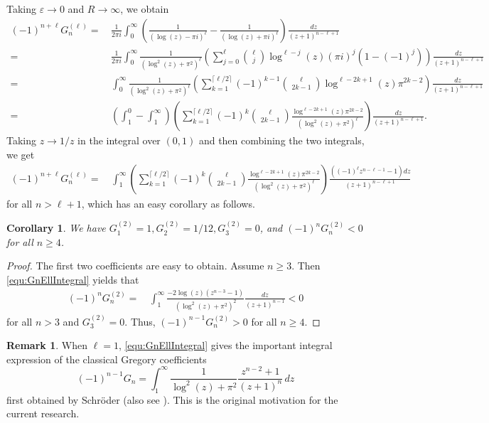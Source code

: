 \documentclass[11pt]{article}
\newcommand\eps{{\varepsilon}}
\theoremstyle{plain}
\newtheorem{cor}[thm]{Corollary}
\theoremstyle{definition}
\newtheorem{re}[thm]{Remark}
\begin{document}
Taking $\eps\to 0$ and $R\to \infty$, we obtain
\begin{align*}
(-1)^{n+\ell}  G_n^{(\ell)}=&\, \frac{1}{2\pi i}  \int_0^\infty  \left(\frac{1}{(\log(z)-\pi i)^\ell}- \frac{1}{(\log(z)+\pi i)^\ell}\right) \frac{dz}{(z+1)^{n-\ell+1}}\\
=&\,    \frac{1}{2\pi i} \int_0^\infty  \frac{1}{(\log^2(z)+\pi^2)^\ell} \left( \sum_{j=0}^\ell \binom{\ell}{j}  \log^{\ell-j}(z)(\pi i)^j(1-(-1)^j) \right)\frac{dz}{(z+1)^{n-\ell+1}}\\
=&\,    \int_0^\infty  \frac{1}{(\log^2(z)+\pi^2)^\ell} \left( \sum_{k=1}^{\lceil \ell/2\rceil} (-1)^{k-1} \binom{\ell}{2k-1}
                                            \log^{\ell-2k+1}(z) \pi^{2k-2}  \right)\frac{dz}{(z+1)^{n-\ell+1}}\\
=&\,    \left( \int_1^0-\int_1^\infty \right)   \left( \sum_{k=1}^{\lceil \ell/2\rceil} (-1)^k \binom{\ell}{2k-1}
                                         \frac{\log^{\ell-2k+1}(z) \pi^{2k-2}}{(\log^2(z)+\pi^2)^\ell} \right)\frac{dz}{(z+1)^{n-\ell+1}}.
\end{align*}
Taking $z\to 1/z$ in the integral over $(0,1)$ and then combining the two integrals, we get
\begin{align} \label{equ:GnEllIntegral}
(-1)^{n+\ell}  G_n^{(\ell)}
=&\,     \int_1^\infty   \left( \sum_{k=1}^{\lceil \ell/2\rceil} (-1)^k \binom{\ell}{2k-1}
               \frac{\log^{\ell-2k+1}(z) \pi^{2k-2}}{(\log^2(z)+\pi^2)^\ell}  \right)\frac{((-1)^{\ell} z^{n-\ell-1}-1)dz}{(z+1)^{n-\ell+1}}
\end{align}
for all $n>\ell+1$, which has an easy corollary as follows.

\begin{cor}\label{cor:order2Conj}
We have $G_1^{(2)}=1, G_2^{(2)}=1/12, G_3^{(2)}=0$, and $(-1)^{n} G_n^{(2)}<0$ for all $n\ge 4$.
\end{cor}

\begin{proof}
The first two coefficients are easy to obtain. Assume $n\ge 3$.  Then \eqref{equ:GnEllIntegral} yields that
\begin{align*}
(-1)^n G_n^{(2)}=&\,    \int_1^\infty  \frac{-2\log(z)(z^{n-3}-1)}{(\log^2(z)+\pi^2)^2} \frac{dz}{(z+1)^{n-1}}<0
\end{align*}
for all $n>3$ and $G_3^{(2)}=0$. Thus, $(-1)^{n-1} G_n^{(2)}>0$ for all $n\ge 4$.
\end{proof}

\begin{re}\label{rem:nonZero}
When $\ell=1$, \eqref{equ:GnEllIntegral} gives the important integral expression of the classical Gregory coefficients
\begin{equation}\label{equ:nonZero}
(-1)^{n-1} G_n=\int_1^\infty   \frac{1}{\log^2(z)+\pi^2} \frac{z^{n-2}+1}{(z+1)^n}\, dz
\end{equation}
first obtained by Schr\"oder \cite{Schr1880} (also see \cite{Bl2017}). This is the original motivation for the current research.
\end{re}
\end{document}
